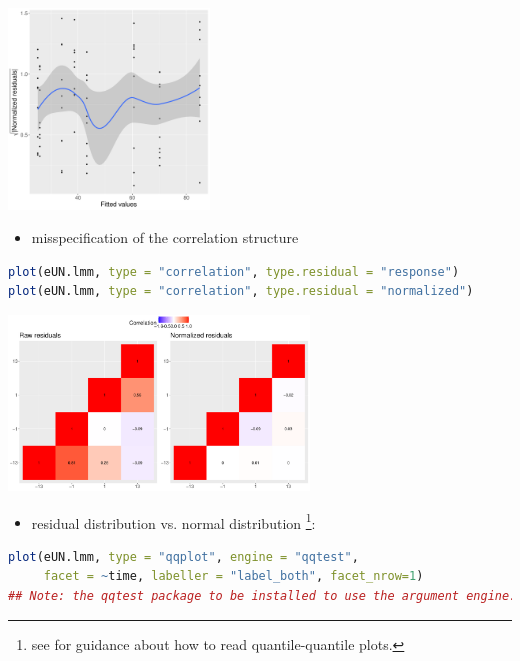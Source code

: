 \documentclass[12pt]{article}
\begin{document}
\begin{center}
\includegraphics[width=0.4\textwidth]{./figures/diag-scatterplot2.pdf}
\end{center}

\begin{itemize}
\item misspecification of the correlation structure
\end{itemize}
\begin{lstlisting}[language=r,numbers=none]
plot(eUN.lmm, type = "correlation", type.residual = "response")
plot(eUN.lmm, type = "correlation", type.residual = "normalized")
\end{lstlisting}

\begin{center}
\includegraphics[width=0.6\textwidth]{./figures/diag-correlation.pdf}
\end{center}

\begin{itemize}
\item residual distribution vs. normal distribution \footnote{see \cite{oldford2016self} for guidance
about how to read quantile-quantile plots.}:
\end{itemize}

\begin{lstlisting}[language=r,numbers=none]
plot(eUN.lmm, type = "qqplot", engine = "qqtest",
     facet = ~time, labeller = "label_both", facet_nrow=1)
## Note: the qqtest package to be installed to use the argument engine.plot = "qqtest" 
\end{lstlisting}
\end{document}
